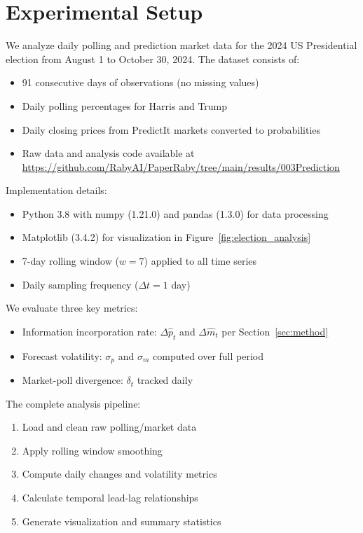 \documentclass{article} %
\begin{document}
\section{Experimental Setup}
\label{sec:experimental}

We analyze daily polling and prediction market data for the 2024 US Presidential election from August 1 to October 30, 2024. The dataset consists of:

\begin{itemize}
    \item 91 consecutive days of observations (no missing values)
    \item Daily polling percentages for Harris and Trump
    \item Daily closing prices from PredictIt markets converted to probabilities
    \item Raw data and analysis code available at \url{https://github.com/RabyAI/PaperRaby/tree/main/results/003Prediction}
\end{itemize}

Implementation details:
\begin{itemize}
    \item Python 3.8 with numpy (1.21.0) and pandas (1.3.0) for data processing
    \item Matplotlib (3.4.2) for visualization in Figure~\ref{fig:election_analysis}
    \item 7-day rolling window ($w=7$) applied to all time series
    \item Daily sampling frequency ($\Delta t = 1$ day)
\end{itemize}

We evaluate three key metrics:
\begin{itemize}
    \item Information incorporation rate: $\Delta \hat{p}_t$ and $\Delta \hat{m}_t$ per Section~\ref{sec:method}
    \item Forecast volatility: $\sigma_p$ and $\sigma_m$ computed over full period
    \item Market-poll divergence: $\delta_t$ tracked daily
\end{itemize}

The complete analysis pipeline:
\begin{enumerate}
    \item Load and clean raw polling/market data
    \item Apply rolling window smoothing
    \item Compute daily changes and volatility metrics
    \item Calculate temporal lead-lag relationships
    \item Generate visualization and summary statistics
\end{enumerate}
\end{document}
